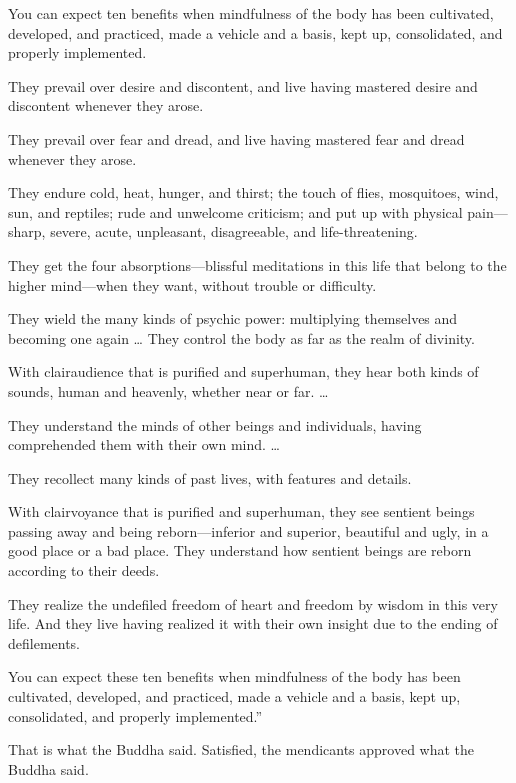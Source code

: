 \documentclass[12pt,openany]{book}%
\begin{document}
You can expect ten benefits when mindfulness of the body has been cultivated, developed, and practiced, made a vehicle and a basis, kept up, consolidated, and properly implemented. 

They prevail over desire and discontent, and live having mastered desire and discontent whenever they arose. 

They prevail over fear and dread, and live having mastered fear and dread whenever they arose. 

They endure cold, heat, hunger, and thirst; the touch of flies, mosquitoes, wind, sun, and reptiles; rude and unwelcome criticism; and put up with physical pain—sharp, severe, acute, unpleasant, disagreeable, and life-threatening. 

They get the four absorptions—blissful meditations in this life that belong to the higher mind—when they want, without trouble or difficulty. 

They wield the many kinds of psychic power: multiplying themselves and becoming one again … They control the body as far as the realm of divinity. 

With clairaudience that is purified and superhuman, they hear both kinds of sounds, human and heavenly, whether near or far. … 

They understand the minds of other beings and individuals, having comprehended them with their own mind. … 

They recollect many kinds of past lives, with features and details. 

With clairvoyance that is purified and superhuman, they see sentient beings passing away and being reborn—inferior and superior, beautiful and ugly, in a good place or a bad place. They understand how sentient beings are reborn according to their deeds. 

They realize the undefiled freedom of heart and freedom by wisdom in this very life. And they live having realized it with their own insight due to the ending of defilements. 

You can expect these ten benefits when mindfulness of the body has been cultivated, developed, and practiced, made a vehicle and a basis, kept up, consolidated, and properly implemented.” 

That is what the Buddha said. Satisfied, the mendicants approved what the Buddha said. 
\end{document}
